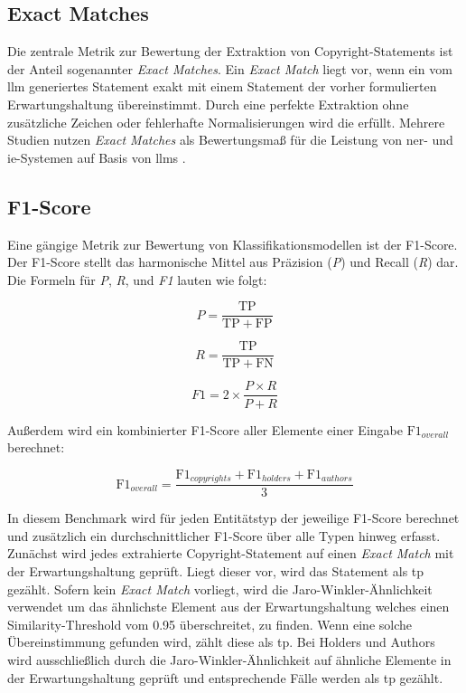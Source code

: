 \subsection{Exact Matches}
Die zentrale Metrik zur Bewertung der Extraktion von Copyright-Statements ist der Anteil sogenannter \textit{Exact Matches}.
Ein \textit{Exact Match} liegt vor, wenn ein vom \gls{llm} generiertes Statement exakt mit einem Statement der vorher formulierten Erwartungshaltung übereinstimmt.
Durch eine perfekte Extraktion ohne zusätzliche Zeichen oder fehlerhafte Normalisierungen wird die  erfüllt.
Mehrere Studien nutzen \textit{Exact Matches} als Bewertungsmaß für die Leistung von \gls{ner}- und \gls{ie}-Systemen auf Basis von \glspl{llm} \autocite{dunn_structured_2022}\autocite{hu_improving_2024}.

\subsection{F1-Score}
Eine gängige Metrik zur Bewertung von Klassifikationsmodellen ist der F1-Score\autocite{noauthor_f-score_2025}.
Der F1-Score stellt das harmonische Mittel aus Präzision (\textit{P}) und Recall (\textit{R}) dar.
Die Formeln für \textit{P}, \textit{R}, und \textit{F1} lauten wie folgt:

\[
 P = \frac{\mathrm{TP}}{\mathrm{TP} + \mathrm{FP}}
\]

\[
 R = \frac{\mathrm{TP}}{\mathrm{TP} + \mathrm{FN}}
\]

\[
 F1 = 2 \times \frac{P \times R}{P + R}
\]

Außerdem wird ein kombinierter F1-Score aller Elemente einer Eingabe $\mathrm{F1}_{overall}$ berechnet:

\[
 \mathrm{F1}_{overall} = \frac{\mathrm{F1}_{copyrights} + \mathrm{F1}_{holders} + \mathrm{F1}_{authors}}{3}
\]

In diesem Benchmark wird für jeden Entitätstyp der jeweilige F1-Score berechnet und zusätzlich ein durchschnittlicher F1-Score über alle Typen hinweg erfasst.
Zunächst wird jedes extrahierte Copyright-Statement auf einen \textit{Exact Match} mit der Erwartungshaltung geprüft.
Liegt dieser vor, wird das Statement als \gls{tp} gezählt.
Sofern kein \textit{Exact Match} vorliegt, wird die Jaro-Winkler-Ähnlichkeit\autocite{noauthor_jarowinkler_nodate} verwendet um das ähnlichste Element aus der Erwartungshaltung welches einen Similarity-Threshold vom \num{0,95} überschreitet, zu finden.
Wenn eine solche Übereinstimmung gefunden wird, zählt diese als \gls{tp}.
Bei Holders und Authors wird ausschließlich durch die Jaro-Winkler-Ähnlichkeit auf ähnliche Elemente in der Erwartungshaltung geprüft und entsprechende Fälle werden als \gls{tp} gezählt.

